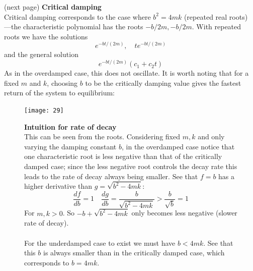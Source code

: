 \documentclass{report}
\begin{document}
(next page)
\newpage
\noindent\textbf{Critical damping}\\
Critical damping corresponds to the case where $b^2=4mk$ (repeated real roots)\\---the characteristic polynomial 
has the roots $-b/2m,-b/2m$.
With repeated roots we have the solutions
\begin{equation*}
e^{-bt/(2m)},\quad te^{-bt/(2m)}
\end{equation*}
and the general solution
\begin{equation*}
e^{-bt/(2m)}(c_1+c_2t)
\end{equation*}
As in the overdamped case, this does not oscillate. It is worth noting that for a fixed $m$ and $k$, choosing $b$
to be the critically damping value gives the fastest return of the system to equilibrium:
\begin{figure}[h]
\begin{center}
\texttt{[image: 29]}\\
\end{center}
\textbf{Intuition for rate of decay}\\
This can be seen from the roots. Considering fixed $m,k$ and only varying the damping constant $b$, 
in the overdamped case notice that one characteristic root is less negative than that of the 
critically damped case; since the less negative root controls the decay rate this leads to the rate of decay always
being smaller. See that $f=b$ has a higher derivative than
$g=\sqrt{b^2-4mk}$:
\begin{equation*}
\frac{df}{db}=1\quad\frac{dg}{db}=\frac{b}{\sqrt{b^2-4mk}}
>\frac{b}{\sqrt{b}}=1
\end{equation*}
For $m,k>0$. So $-b+\sqrt{b^2-4mk}$ only becomes less negative (slower rate of decay).\\
\vspace{1mm}\\
For the underdamped case to exist we must have $b<4mk$. See that this $b$ is always smaller than in the critically
damped case, which corresponds to $b=4mk$.
\end{figure}
\newpage
\end{document}
